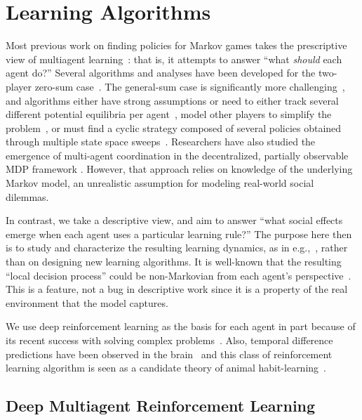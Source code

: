 \documentclass{aamas2017}
\begin{document}
\section{Learning Algorithms} \label{sec:indep_deep_learning}

Most previous work on finding policies for Markov games takes the prescriptive view of multiagent learning~\cite{Shoham07}: that is, it attempts to answer ``what {\it should} each agent do?'' Several algorithms and analyses have been developed for the two-player zero-sum case~\cite{Littman94markovgames,Lagoudakis02,Perolat15,Perolat16Softened,Bosansky16Algorithms}. The general-sum case is significantly more challenging~\cite{Zinkevich06}, and algorithms either have strong assumptions or need to either track several different potential equilibria per agent~\cite{Hu98NashQ,Greenwald03CEQ}, model other players to simplify the problem~\cite{Littman01}, or must find a cyclic strategy composed of several policies obtained through multiple state space sweeps~\cite{Perolat16}. Researchers have also studied the emergence of multi-agent coordination in the decentralized, partially observable MDP framework \cite{gmytrasiewicz2005framework, varakantham2009exploiting, becker2004solving}. However, that approach relies on knowledge of the underlying Markov model, an unrealistic assumption for modeling real-world social dilemmas. 

In contrast, we take a descriptive view, and aim to answer ``what social effects emerge when each agent uses a particular learning rule?'' The purpose here then is to study and characterize the resulting learning dynamics, as in e.g.,~\cite{wunder10, Bloembergen15}, rather than on designing new learning algorithms. It is well-known that the resulting ``local decision process'' could be non-Markovian from each agent's perspective~\cite{Laurent11}. This is a feature, not a bug in descriptive work since it is a property of the real environment that the model captures. 

We use deep reinforcement learning as the basis for each agent in part because of its recent success with solving complex problems~\cite{Mnih:2015,Silver16Go}. Also, temporal difference predictions have been observed in the brain~\cite{Schultz97} and this class of reinforcement learning algorithm is seen as a candidate theory of animal habit-learning~\cite{Niv09}.

\subsection{Deep Multiagent Reinforcement Learning}
\end{document}
